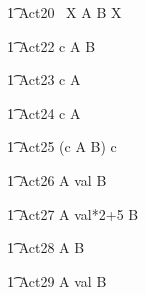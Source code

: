 \begin{circusaction}
	\t1 Act20 \circdef \circmu~X \circspot A \circtimeout {} \rcirctime B \circseq X \\
\end{circusaction}


\begin{circusaction}
	\t1 Act22 \circdef c \then  A \circtimeout {} \rcirctime B \\
\end{circusaction}

\begin{circusaction}
	\t1 Act23 \circdef c \then  A \circtimeout {} \rcirctime \Skip \\
\end{circusaction}

\begin{circusaction}
	\t1 Act24 \circdef c \then  A \circtimeout {} \rcirctime \Stop \\
\end{circusaction}

\begin{circusaction}
	\t1 Act25 \circdef (c \then A \circtimeout {} \rcirctime B) \circhide c \\
\end{circusaction}

\begin{circusaction}
	\t1 Act26 \circdef A \circtimeout \lcirctime val \rcirctime B \\
\end{circusaction}

\begin{circusaction}
	\t1 Act27 \circdef A \circtimeout \lcirctime val*2+5 \rcirctime B \\
\end{circusaction}
 
\begin{circusaction}
    	\t1 Act28 \circdef A \circtimeout {}  \rcirctime B \\
\end{circusaction}

\begin{circusaction}
    	\t1 Act29 \circdef A \circtimeout {} \upto val \rcirctime B \\
\end{circusaction}

